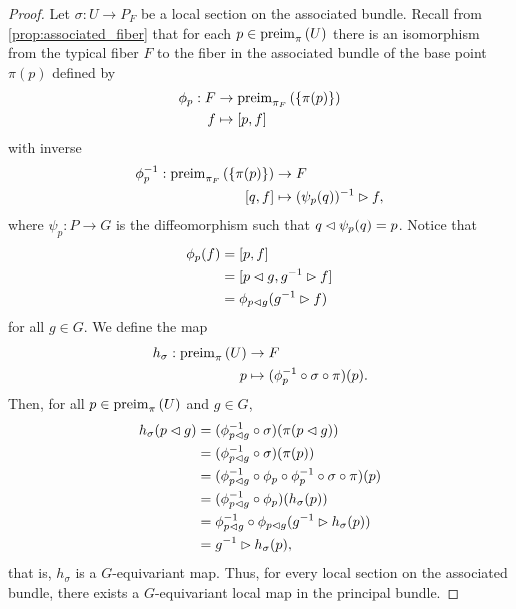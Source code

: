 \begin{proof}
    Let \(\sigma : U \to P_F\) be a local section on the associated bundle. Recall from \cref{prop:associated_fiber} that for each \(p \in \operatorname{preim}_{\pi}{\left(U\right)}\) there is an isomorphism from the typical fiber \(F\) to the fiber in the associated bundle of the base point \(\pi(p)\) defined by
    \begin{align*}
        \phi_p : F &\to \operatorname{preim}_{\pi_F}{\left(\{\pi(p)\}\right)}\\
                 f &\mapsto [p, f]
    \end{align*}
    with inverse
    \begin{align*}
        \phi_p^{-1} : \operatorname{preim}_{\pi_F}{\left(\{\pi(p)\}\right)} &\to F\\
                                            [q,f] &\mapsto (\psi_{p}(q))^{-1} \mathbin{\vartriangleright} f,
    \end{align*}
    where \(\psi_p : P \to G\) is the diffeomorphism such that \(q \mathbin{\vartriangleleft} \psi_p(q) = p\). Notice that
    \begin{align*}
        \phi_p(f) &= [p,f]\\
                    &= [p\mathbin{\vartriangleleft} g, g^{-1}\mathbin{\vartriangleright} f]\\
                    &= \phi_{p\mathbin{\vartriangleleft} g}(g^{-1} \mathbin{\vartriangleright} f)
    \end{align*}
    for all \(g \in G\). We define the map
    \begin{align*}
        h_\sigma : \operatorname{preim}_{\pi}{\left(U\right)} &\to F\\
                                p &\mapsto (\phi_p^{-1} \circ \sigma \circ \pi) (p).
    \end{align*}
    Then, for all \(p \in \operatorname{preim}_{\pi}{\left(U\right)}\) and \(g \in G\),
    \begin{align*}
        h_{\sigma}(p \mathbin{\vartriangleleft} g) &= (\phi_{p\mathbin{\vartriangleleft} g}^{-1}\circ\sigma)(\pi(p \mathbin{\vartriangleleft} g))\\
                              &= (\phi_{p \mathbin{\vartriangleleft} g}^{-1} \circ \sigma)(\pi(p))\\
                              &= (\phi_{p\mathbin{\vartriangleleft} g}^{-1} \circ \phi_p \circ \phi_p^{-1} \circ \sigma \circ \pi)(p)\\
                              &= (\phi_{p\mathbin{\vartriangleleft} g}^{-1} \circ \phi_p)(h_\sigma(p))\\
                              &= \phi_{p\mathbin{\vartriangleleft} g}^{-1} \circ \phi_{p \mathbin{\vartriangleleft} g}(g^{-1} \mathbin{\vartriangleright} h_\sigma(p))\\
                              &= g^{-1} \mathbin{\vartriangleright} h_\sigma(p),
    \end{align*}
    that is, \(h_\sigma\) is a \(G\)-equivariant map. Thus, for every local section on the associated bundle, there exists a \(G\)-equivariant local map in the principal bundle.


\end{proof}
